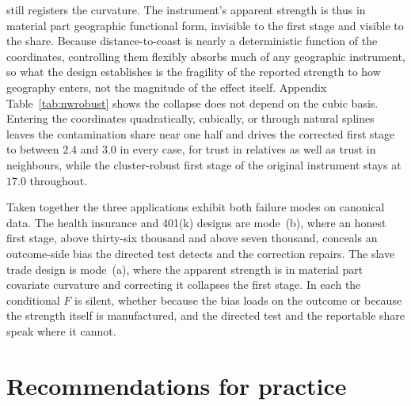 \documentclass[preprint,11pt,authoryear]{elsarticle}
\theoremstyle{definition}
\begin{document}
still registers the curvature. The instrument's apparent strength is thus in material
part geographic functional form, invisible to the first stage and visible to the share.
Because distance-to-coast is nearly a deterministic function of the coordinates,
controlling them flexibly absorbs much of any geographic instrument, so what the design
establishes is the fragility of the reported strength to how geography enters, not the
magnitude of the effect itself. Appendix Table~\ref{tab:nwrobust} shows the collapse does not depend on the cubic basis. Entering the coordinates quadratically, cubically, or through natural splines leaves the contamination share near one half and drives the corrected first stage to between $2.4$ and $3.0$ in every case, for trust in relatives as well as trust in neighbours, while the cluster-robust first stage of the original instrument stays at $17.0$ throughout.

Taken together the three applications exhibit both failure modes on canonical data. The
health insurance and 401(k) designs are mode~(b), where an honest first stage, above
thirty-six thousand and above seven thousand, conceals an outcome-side bias the directed
test detects and the correction repairs. The slave trade design is mode~(a), where the
apparent strength is in material part covariate curvature and correcting it collapses
the first stage. In each the conditional $F$ is silent, whether because the bias loads
on the outcome or because the strength itself is manufactured, and the directed test and
the reportable share speak where it cannot.

\section{Recommendations for practice}\label{sec:practice}
\end{document}
